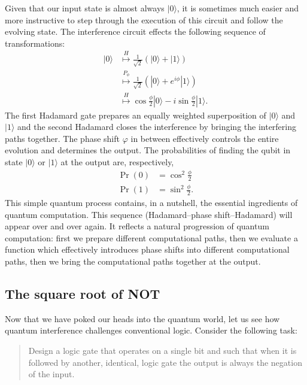 \documentclass[fleqn]{article}
\renewcommand{\footnote}[1]{\en{#1}}
\begin{document}
Given that our input state is almost always \(|0\rangle\), it is sometimes much easier and more instructive to step through the execution of this circuit and follow the evolving state.
The interference circuit effects the following sequence of transformations:\footnote{We ignore the global phase factor \(e^{i\frac{\varphi}{2}}\).}
\[
  \begin{aligned}
    |0\rangle
    &\overset{H}{\longmapsto}
    \frac{1}{\sqrt{2}} \left(
      |0\rangle+|1\rangle
    \right)
  \\&\overset{P_\phi}{\longmapsto}
    \frac{1}{\sqrt{2}} \left(
      |0\rangle+e^{i\phi}|1\rangle
    \right)
  \\&\overset{H}{\longmapsto}
    \cos\frac{\phi}{2}|0\rangle - i\sin\frac{\phi}{2}|1\rangle.
  \end{aligned}
\]
The first Hadamard gate prepares an equally weighted superposition of \(|0\rangle\) and \(|1\rangle\) and the second Hadamard closes the interference by bringing the interfering paths together.
The phase shift \(\varphi\) in between effectively controls the entire evolution and determines the output.
The probabilities of finding the qubit in state \(|0\rangle\) or \(|1\rangle\) at the output are, respectively,
\[
  \begin{aligned}
    \Pr(0) &= \cos^2\frac{\phi}{2}
  \\\Pr(1) &= \sin^2\frac{\phi}{2}.
  \end{aligned}
\]
This simple quantum process contains, in a nutshell, the essential ingredients of quantum computation.
This sequence (Hadamard--phase shift--Hadamard) will appear over and over again.
It reflects a natural progression of quantum computation: first we prepare different computational paths, then we evaluate a function which effectively introduces phase shifts into different computational paths, then we bring the computational paths together at the output.

\hypertarget{the-square-root-of-not}{%
\subsection{The square root of NOT}\label{the-square-root-of-not}}

Now that we have poked our heads into the quantum world, let us see how quantum interference challenges conventional logic.
Consider the following task:

\begin{quote}
Design a logic gate that operates on a single bit and such that when it is followed by another, identical, logic gate the output is always the negation of the input.
\end{quote}
\end{document}
